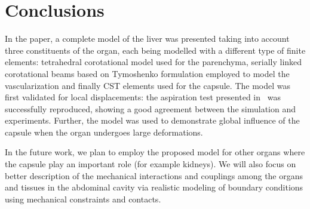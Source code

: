 \documentclass[final,3p,times,twocolumn]{elsarticle}
\begin{document}


\section{Conclusions} %
In the paper, a complete model of the liver was presented taking into account 
three constituents of the organ, each being modelled with a different type 
of finite elements: tetrahedral corotational model used for the parenchyma, serially 
linked corotational beams based on Tymoshenko formulation employed to model the vascularization 
and finally CST elements used for the capsule. 
The model was first validated for local displacements: the aspiration test presented in~\cite{Hollenstein2006} 
was successfully reproduced, showing a good agreement between the simulation and experiments. 
Further, the model was used to demonstrate global influence of the capsule when the organ 
undergoes large deformations. 

In the future work, we plan to employ the proposed model for other organs where the capsule play an important role
(for example kidneys). We will also focus on better description of the mechanical interactions and couplings among the organs and tissues in the abdominal 
cavity via realistic modeling of boundary conditions using mechanical constraints and contacts.

%







\end{document}
